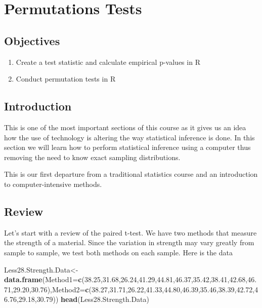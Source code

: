 \documentclass[]{book}
\newenvironment{Shaded}{\begin{snugshade}}{\end{snugshade}}
\newcommand{\KeywordTok}[1]{\textcolor[rgb]{0.13,0.29,0.53}{\textbf{#1}}}
\newcommand{\DataTypeTok}[1]{\textcolor[rgb]{0.13,0.29,0.53}{#1}}
\newcommand{\FloatTok}[1]{\textcolor[rgb]{0.00,0.00,0.81}{#1}}
\newcommand{\NormalTok}[1]{#1}
\providecommand{\tightlist}{%
  \setlength{\itemsep}{0pt}\setlength{\parskip}{0pt}}
\theoremstyle{definition}
\theoremstyle{definition}
\theoremstyle{definition}
\theoremstyle{remark}
\begin{document}
\hypertarget{L24}{\section{Permutations Tests}\label{L24}}

\subsection{Objectives}\label{objectives-23}

\begin{enumerate}
\def\labelenumi{\arabic{enumi}.}
\tightlist
\item
  Create a test statistic and calculate empirical p-values in R\\
\item
  Conduct permutation tests in R
\end{enumerate}

\subsection{Introduction}\label{introduction-2}

This is one of the most important sections of this course as it gives us
an idea how the use of technology is altering the way statistical
inference is done. In this section we will learn how to perform
statistical inference using a computer thus removing the need to know
exact sampling distributions.

This is our first departure from a traditional statistics course and an
introduction to computer-intensive methods.

\subsection{Review}\label{review-4}

Let's start with a review of the paired t-test. We have two methods that
measure the strength of a material. Since the variation in strength may
vary greatly from sample to sample, we test both methods on each sample.
Here is the data

\begin{Shaded}
\begin{Highlighting}[]
\NormalTok{Less28.Strength.Data<-}\KeywordTok{data.frame}\NormalTok{(}\DataTypeTok{Method1=}\KeywordTok{c}\NormalTok{(}\FloatTok{38.25}\NormalTok{,}\FloatTok{31.68}\NormalTok{,}\FloatTok{26.24}\NormalTok{,}\FloatTok{41.29}\NormalTok{,}\FloatTok{44.81}\NormalTok{,}\FloatTok{46.37}\NormalTok{,}\FloatTok{35.42}\NormalTok{,}\FloatTok{38.41}\NormalTok{,}\FloatTok{42.68}\NormalTok{,}\FloatTok{46.71}\NormalTok{,}\FloatTok{29.20}\NormalTok{,}\FloatTok{30.76}\NormalTok{),}\DataTypeTok{Method2=}\KeywordTok{c}\NormalTok{(}\FloatTok{38.27}\NormalTok{,}\FloatTok{31.71}\NormalTok{,}\FloatTok{26.22}\NormalTok{,}\FloatTok{41.33}\NormalTok{,}\FloatTok{44.80}\NormalTok{,}\FloatTok{46.39}\NormalTok{,}\FloatTok{35.46}\NormalTok{,}\FloatTok{38.39}\NormalTok{,}\FloatTok{42.72}\NormalTok{,}\FloatTok{46.76}\NormalTok{,}\FloatTok{29.18}\NormalTok{,}\FloatTok{30.79}\NormalTok{))}
\KeywordTok{head}\NormalTok{(Less28.Strength.Data)}
\end{Highlighting}
\end{Shaded}
\end{document}
